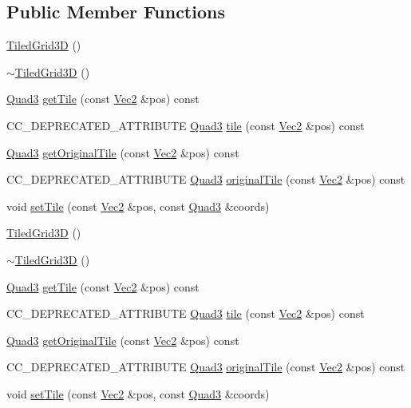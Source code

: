 \subsection*{Public Member Functions}
\begin{DoxyCompactItemize}
\item 
\hyperlink{classTiledGrid3D_a0e8af3f438981892b1c2e2e4da6a8f2b}{Tiled\+Grid3D} ()
\item 
\hyperlink{classTiledGrid3D_af00d14e579ce6ee5c771796d370105a3}{$\sim$\+Tiled\+Grid3D} ()
\item 
\hyperlink{structQuad3}{Quad3} \hyperlink{classTiledGrid3D_a7c5286c5de85d37e85c4b5ffa9426795}{get\+Tile} (const \hyperlink{classVec2}{Vec2} \&pos) const
\item 
C\+C\+\_\+\+D\+E\+P\+R\+E\+C\+A\+T\+E\+D\+\_\+\+A\+T\+T\+R\+I\+B\+U\+TE \hyperlink{structQuad3}{Quad3} \hyperlink{classTiledGrid3D_ac7d0e5bdfb4a6bb8049649bc278dc14f}{tile} (const \hyperlink{classVec2}{Vec2} \&pos) const
\item 
\hyperlink{structQuad3}{Quad3} \hyperlink{classTiledGrid3D_a653e02adb803ade21b940dacb4da8e41}{get\+Original\+Tile} (const \hyperlink{classVec2}{Vec2} \&pos) const
\item 
C\+C\+\_\+\+D\+E\+P\+R\+E\+C\+A\+T\+E\+D\+\_\+\+A\+T\+T\+R\+I\+B\+U\+TE \hyperlink{structQuad3}{Quad3} \hyperlink{classTiledGrid3D_ae84973e0ef28dcba4eabd71210b99b1a}{original\+Tile} (const \hyperlink{classVec2}{Vec2} \&pos) const
\item 
void \hyperlink{classTiledGrid3D_ac835fb269e1bd0447c63d645efbb85b8}{set\+Tile} (const \hyperlink{classVec2}{Vec2} \&pos, const \hyperlink{structQuad3}{Quad3} \&coords)
\item 
\hyperlink{classTiledGrid3D_a0e8af3f438981892b1c2e2e4da6a8f2b}{Tiled\+Grid3D} ()
\item 
\hyperlink{classTiledGrid3D_af00d14e579ce6ee5c771796d370105a3}{$\sim$\+Tiled\+Grid3D} ()
\item 
\hyperlink{structQuad3}{Quad3} \hyperlink{classTiledGrid3D_a7c5286c5de85d37e85c4b5ffa9426795}{get\+Tile} (const \hyperlink{classVec2}{Vec2} \&pos) const
\item 
C\+C\+\_\+\+D\+E\+P\+R\+E\+C\+A\+T\+E\+D\+\_\+\+A\+T\+T\+R\+I\+B\+U\+TE \hyperlink{structQuad3}{Quad3} \hyperlink{classTiledGrid3D_ac7d0e5bdfb4a6bb8049649bc278dc14f}{tile} (const \hyperlink{classVec2}{Vec2} \&pos) const
\item 
\hyperlink{structQuad3}{Quad3} \hyperlink{classTiledGrid3D_a653e02adb803ade21b940dacb4da8e41}{get\+Original\+Tile} (const \hyperlink{classVec2}{Vec2} \&pos) const
\item 
C\+C\+\_\+\+D\+E\+P\+R\+E\+C\+A\+T\+E\+D\+\_\+\+A\+T\+T\+R\+I\+B\+U\+TE \hyperlink{structQuad3}{Quad3} \hyperlink{classTiledGrid3D_ae84973e0ef28dcba4eabd71210b99b1a}{original\+Tile} (const \hyperlink{classVec2}{Vec2} \&pos) const
\item 
void \hyperlink{classTiledGrid3D_ac835fb269e1bd0447c63d645efbb85b8}{set\+Tile} (const \hyperlink{classVec2}{Vec2} \&pos, const \hyperlink{structQuad3}{Quad3} \&coords)
\end{DoxyCompactItemize}
